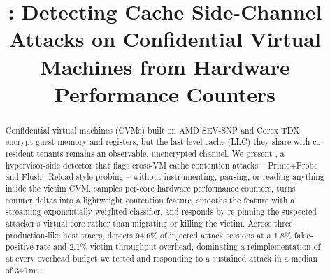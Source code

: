 \documentclass[conference]{IEEEtran}
\begin{document}
\title{\sysname: Detecting Cache Side-Channel Attacks on Confidential Virtual\\ Machines from Hardware Performance Counters}

\author{
\and
{}
\and
{}
}

\maketitle

\noindent{}
\vspace{0.8em}

\begin{abstract}
Confidential virtual machines (CVMs) built on AMD SEV-SNP and Corex TDX encrypt guest memory
and registers, but the last-level cache (LLC) they share with co-resident tenants remains an
observable, unencrypted channel. We present \sysname, a hypervisor-side detector that flags
cross-VM cache contention attacks -- Prime+Probe and Flush+Reload style probing -- without
instrumenting, pausing, or reading anything inside the victim CVM. \sysname{} samples
per-core hardware performance counters, turns counter deltas into a lightweight contention
feature, smooths the feature with a streaming exponentially-weighted classifier, and responds
by re-pinning the suspected attacker's virtual core rather than migrating or killing the
victim. Across three production-like host traces, \sysname{} detects 94.6\% of injected
attack sessions at a 1.8\% false-positive rate and 2.1\% victim throughput overhead,
dominating a reimplementation of \baseline{} at every overhead budget we tested and
responding to a sustained attack in a median of 340\,ms.
\end{abstract}
\end{document}
